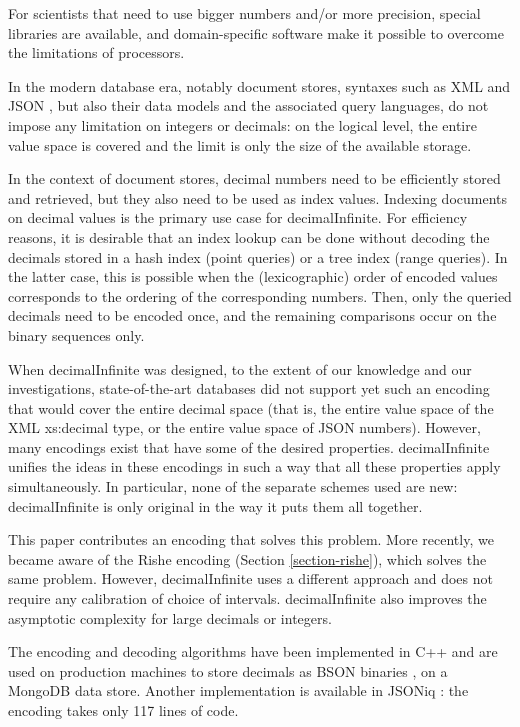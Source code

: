 \documentclass{acm_proc_article-sp}
\begin{document}
For scientists that need to use bigger numbers and/or more precision, special libraries are available, and domain-specific software \cite{MAPLE} \cite{MATHEMATICA} \cite{MATLAB} make it possible to overcome the limitations of processors.

In the modern database era, notably document stores, syntaxes such as XML \cite{XML} and JSON \cite{JSON}, but also their data models and the associated query languages, do not impose any limitation on integers or decimals: on the logical level, the entire value space is covered and the limit is only the size of the available storage.

In the context of document stores, decimal numbers need to be efficiently stored and retrieved, but they also need to be used as index values. Indexing documents on decimal values is the primary use case for decimalInfinite. For efficiency reasons, it is desirable that an index lookup can be done without decoding the decimals stored in a hash index (point queries) or a tree index (range queries). In the latter case, this is possible when the (lexicographic) order of encoded values corresponds to the ordering of the corresponding numbers. Then, only the queried decimals need to be encoded once, and the remaining comparisons occur on the binary sequences only. 

When decimalInfinite was designed, to the extent of our knowledge and our investigations, state-of-the-art databases did not support yet such an encoding that would cover the entire decimal space (that is, the entire value space of the XML xs:decimal type, or the entire value space of JSON numbers). However, many encodings exist that have some of the desired properties. decimalInfinite unifies the ideas in these encodings in such a way that all these properties apply simultaneously. In particular, none of the separate schemes used are new: decimalInfinite is only original in the way it puts them all together.

This paper contributes an encoding that solves this problem. More recently, we became aware of the Rishe encoding (Section \ref{section-rishe}), which solves the same problem. However, decimalInfinite uses a different approach and does not require any calibration of choice of intervals. decimalInfinite also improves the asymptotic complexity for large decimals or integers.

The encoding and decoding algorithms have been implemented in C++ and are used on production machines to store decimals as BSON binaries \cite{BSON}, on a MongoDB \cite{MongoDB} data store. Another implementation is available in JSONiq \cite{JSONiq}: the encoding takes only 117 lines of code.
\end{document}
